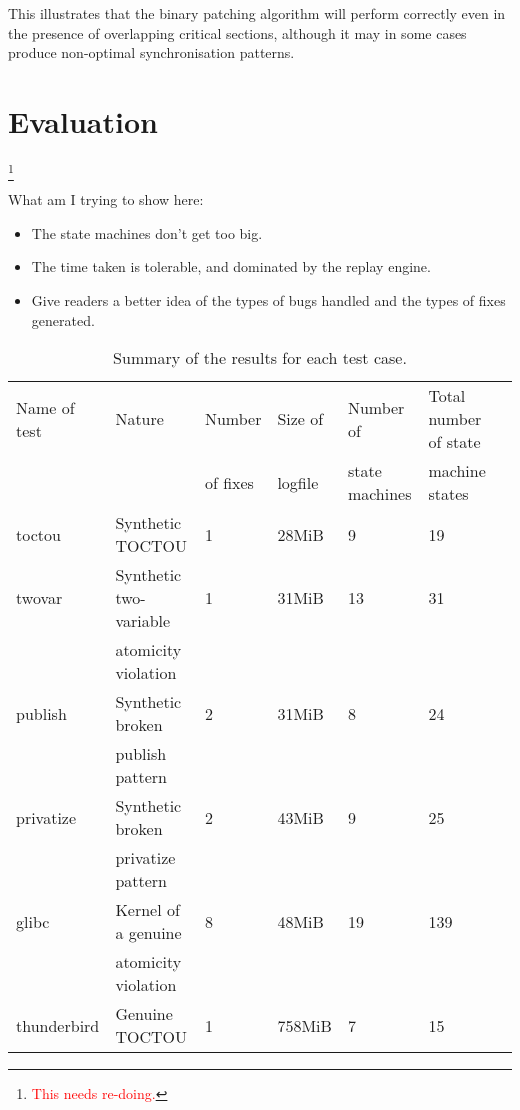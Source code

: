 \documentclass[10pt,twocolumn,preprint,natbib,authoryear]{sigplanconf}
\newcommand{\editorial}[1]{\textcolor{red}{\footnote{\textcolor{red}{#1}}}}
\begin{document}
This illustrates that the binary patching algorithm will perform
correctly even in the presence of overlapping critical sections,
although it may in some cases produce non-optimal synchronisation
patterns.

\section{Evaluation}\editorial{This needs re-doing.}
\label{sect:evaluation}

What am I trying to show here:

\begin{itemize}
\item The state machines don't get too big.
\item The time taken is tolerable, and dominated by the replay engine.
\item Give readers a better idea of the types of bugs handled
  and the types of fixes generated.
\end{itemize}

\begin{table*}
\begin{tabular}{lllllll}
Name of test & Nature                 & Number   & Size of & Number of      & Total number of state\\
             &                        & of fixes & logfile & state machines & machine states\\ \hline
toctou       & Synthetic TOCTOU       & 1        & 28MiB   & 9 & 19\\
twovar       & Synthetic two-variable & 1        & 31MiB   & 13 & 31\\
             & atomicity violation    &          & \\
publish      & Synthetic broken       & 2        & 31MiB   & 8 & 24 \\
             & publish pattern        &          & \\
privatize    & Synthetic broken       & 2        & 43MiB   & 9 & 25 \\
             & privatize pattern      &          & \\
\hline
glibc        & Kernel of a genuine    & 8        & 48MiB   & 19 & 139\\
             & atomicity violation    &          & \\
\hline
thunderbird  & Genuine TOCTOU         & 1        & 758MiB  & 7 & 15
\end{tabular}
\caption{Summary of the results for each test case.}
\label{tab:output_summary}
\end{table*}
\end{document}
